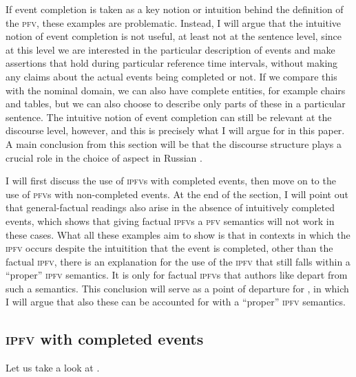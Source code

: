 \documentclass[output=paper]{langscibook}
\begin{document}
If event completion is taken as a key notion or intuition behind the definition of the \textsc{pfv}, these examples are problematic. Instead, I will argue that the intuitive notion of event completion is not useful, at least not at the sentence level, since at this level we are interested in the particular description of events and make assertions that hold during particular reference time intervals, without making any claims about the actual events being completed or not. If we compare this with the nominal domain, we can also have complete entities, for example chairs and tables, but we can also choose to describe only parts of these in a particular sentence. The intuitive notion of event completion can still be relevant at the discourse level, however, and this is precisely what I will argue for in this paper. A main conclusion from this section will be that the discourse structure plays a crucial role in the choice of aspect in Russian \citep[see also][]{altshuler12}.\largerpage[1]

I will first discuss the use of \textsc{ipfv}s with completed events, then move on to the use of \textsc{pfv}s with non-completed events. At the end of the section, I will point out that general-factual readings also arise in the absence of intuitively completed events, which shows that giving factual \textsc{ipfv}s a \textsc{pfv} semantics will not work in these cases. What all these examples aim to show is that in contexts in which the \textsc{ipfv} occurs despite the intuitition that the event is completed, other than the factual \textsc{ipfv}, there is an explanation for the use of the \textsc{ipfv} that still falls within a ``proper'' \textsc{ipfv} semantics. It is only for factual \textsc{ipfv}s that authors like \citet{gronn15} depart from such a semantics. This conclusion will serve as a point of departure for , in which I will argue that also these can be accounted for with a ``proper'' \textsc{ipfv} semantics. 

\subsection{\textsc{ipfv} with completed events}

Let us take a look at  \citep[discussed in][]{gehrke02,gehrke22}.

\label{gehr:ex:bulg}	
\z
\end{document}
